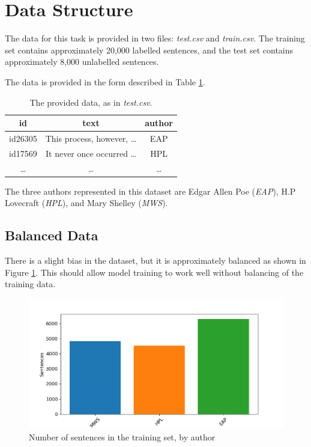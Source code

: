 \section{Data Structure}
\label{sec:data_structure}
The data for this task is provided in two files: \textit{test.csv} and \textit{train.csv}. The training set contains approximately 20,000 labelled sentences, and the test set contains approximately 8,000 unlabelled sentences.

The data is provided in the form described in Table \ref{tab:data_form}.

\begin{table}[h]
\centering
\begin{tabular}{|c|c|c|}
\hline 
\textbf{id} & \textbf{text} & \textbf{author} \\ 
\hline 
id26305 & This process, however, \ldots & EAP \\ 
\hline 
id17569 & It never once occurred \ldots & HPL \\ 
\hline 
\ldots & \ldots & \ldots \\ 
\hline 
\end{tabular} 
\caption{The provided data, as in \textit{test.csv}.}
\label{tab:data_form}
\end{table}
The three authors represented in this dataset are Edgar Allen Poe (\textit{EAP}), H.P Lovecraft (\textit{HPL}), and Mary Shelley (\textit{MWS}).

\subsection{Balanced Data}
\label{sec:balanced_data}

There is a slight bias in the dataset, but it is approximately balanced as shown in Figure \ref{fig:balance}. This should allow model training to work well without balancing of the training data.

\begin{figure}[b]
\centering
\includegraphics[width=\columnwidth]{Figures/Data_Structure/balance.png}
\caption{Number of sentences in the training set, by author}
\label{fig:balance}
\end{figure}

